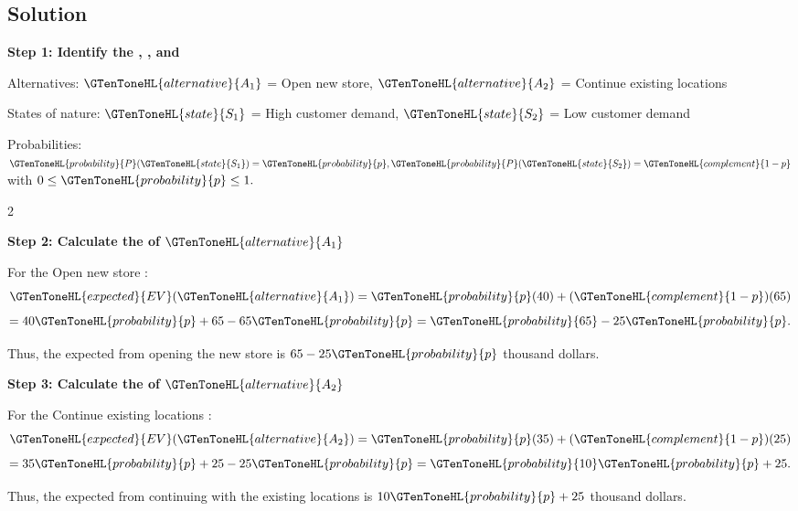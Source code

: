	
	\subsection{Solution}
	
	\textbf{Step 1: Identify the ,   , and }
	
	Alternatives:
	$\GTenToneHL{alternative}{A_1}$ = Open new store,
	$\GTenToneHL{alternative}{A_2}$ = Continue existing locations
	
	States of nature:
	$\GTenToneHL{state}{S_1}$ = High customer demand,
	$\GTenToneHL{state}{S_2}$ = Low customer demand
	
	Probabilities:
	$
	\GTenToneHL{probability}{P}(\GTenToneHL{state}{S_1})=\GTenToneHL{probability}{p},
	\GTenToneHL{probability}{P}(\GTenToneHL{state}{S_2})=\GTenToneHL{complement}{1-p}
	$
	with
	$
	0\leq \GTenToneHL{probability}{p}\leq1.
	$
	
	\vspace{-3mm}
	
	\noindent
	\setlength{\columnseprule}{0.4pt} 
	\begin{multicols}{2}
		\vspace{0pt}
		
		\textbf{Step 2: Calculate the   of $\GTenToneHL{alternative}{A_1}$}
		
		For the Open new store :
		\[
		\GTenToneHL{expected}{EV}(\GTenToneHL{alternative}{A_1})
		=
		\GTenToneHL{probability}{p}(40)
		+
		(\GTenToneHL{complement}{1-p})(65)
		\]
		\[
		=
		40\GTenToneHL{probability}{p}+65-65\GTenToneHL{probability}{p}
		=
		\GTenToneHL{probability}{65}-25\GTenToneHL{probability}{p}.
		\]
		
		Thus, the expected  from opening the new store is
		$65-25\GTenToneHL{probability}{p}$ thousand dollars.
		
		\columnbreak
		
		\textbf{Step 3: Calculate the   of $\GTenToneHL{alternative}{A_2}$}
		
		For the Continue existing locations :
		\[
		\GTenToneHL{expected}{EV}(\GTenToneHL{alternative}{A_2})
		=
		\GTenToneHL{probability}{p}(35)
		+
		(\GTenToneHL{complement}{1-p})(25)
		\]
		\[
		=
		35\GTenToneHL{probability}{p}+25-25\GTenToneHL{probability}{p}
		=
		\GTenToneHL{probability}{10}\GTenToneHL{probability}{p}+25.
		\]
		
		Thus, the expected  from continuing with the existing locations is
		$10\GTenToneHL{probability}{p}+25$ thousand dollars.
		
	\end{multicols}
	
